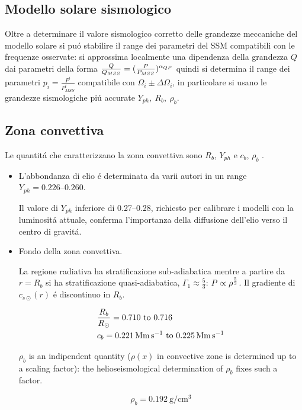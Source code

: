 \documentclass[../main.tex]{subfiles}
\begin{document}


\subsection{Modello solare sismologico}

Oltre a determinare il valore sismologico corretto delle grandezze meccaniche del modello solare si pu\'o stabilire il range dei parametri del SSM compatibili con le frequenze osservate: si approssima localmente una dipendenza della grandezza $Q$ dai parametri della forma $\frac{Q}{Q_{MSS}}=(\frac{P}{P_{MSS}})^{\alpha_{QP}}$ quindi si determina il range dei parametri $p_i=\frac{P^i}{P_{MSS}^i}$ compatibile con $\Omega_i\pm\Delta\Omega_i$, in particolare si usano le grandezze sismologiche pi\'u accurate $Y_{ph},\ R_b,\ \rho_b$.

\subsection{Zona convettiva}

Le quantit\'a che caratterizzano la zona convettiva sono $R_b$, $Y_{ph}$ e $c_b$, $\rho_b$ .

\begin{itemize}
\item L'abbondanza di elio \'e determinata da varii autori in un range $Y_{ph}=\numrange{0.226}{0.260}$.
    
Il valore di $Y_{ph}$ inferiore di \numrange{0.27}{0.28}, richiesto per calibrare i modelli con la luminosit\'a attuale, conferma l'importanza della diffusione dell'elio verso il centro di gravit\'a.
    
\item Fondo della zona convettiva.
 
La regione radiativa ha stratificazione sub-adiabatica mentre a partire da $r=R_b$ si ha stratificazione quasi-adiabatica,  $\Gamma_1\approx\frac{5}{3}$: $P\propto\rho^{\frac{5}{3}}$.
Il gradiente di $c_{s\odot}(r)$ \'e discontinuo in $R_b$.
    
\begin{align*}
&\frac{R_b}{\rsun{}}=\numrange{0.710}{0.716}\\
&c_b=\SIrange{0.221}{0.225}{\mega\meter\per\second}
\end{align*}


$\rho_b$ is an indipendent quantity ($\rho(x)$ in convective zone is determined up to a scaling factor): the helioseismological determination of $\rho_b$ fixes such a factor.

\begin{equation*}
\rho_b=\SI{0.192}{\gram\per\cubic\cm}
\end{equation*}
    
\end{itemize}
\end{document}
